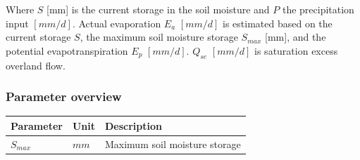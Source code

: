 Where  $S$ [mm] is the current storage in the soil moisture and $P$ the precipitation input $[mm/d]$. Actual evaporation $E_a$ $[mm/d]$ is estimated based on the current storage $S$, the maximum soil moisture storage $S_{max}$ [mm], and the potential evapotranspiration $E_p$ $[mm/d]$. $Q_{se}$ $[mm/d]$ is saturation excess overland flow.

\subsubsection{Parameter overview}
\begin{table}[htbp]
\centering
    \begin{tabular}{lll}
    \toprule
    Parameter & Unit  & Description \\
    \midrule
    $S_{max}$ & $mm$  & Maximum soil moisture storage \\
    \bottomrule
    \end{tabular}%
  \label{tab:addlabel}%
\end{table}%


